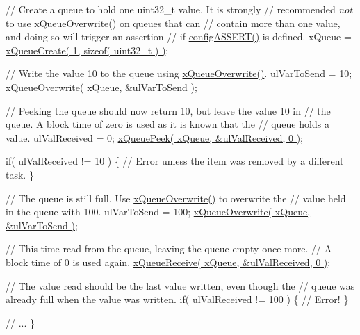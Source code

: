 \begin{DoxyPre}    // Create a queue to hold one uint32\_t value.  It is strongly
    // recommended {\itshape not} to use \hyperlink{queue_8h_a8e9ced123b5a0e37a36d3bbdb2e56b4e}{xQueueOverwrite()} on queues that can
    // contain more than one value, and doing so will trigger an assertion
    // if \hyperlink{_free_r_t_o_s_8h_a228c70cd48927d6ab730ed1a6dfbe35f}{configASSERT()} is defined.
    xQueue = \hyperlink{queue_8h_aeb858b824bd74a934ea7ebb81af2a6bb}{xQueueCreate( 1, sizeof( uint32\_t ) )};\end{DoxyPre}



\begin{DoxyPre}    // Write the value 10 to the queue using \hyperlink{queue_8h_a8e9ced123b5a0e37a36d3bbdb2e56b4e}{xQueueOverwrite()}.
    ulVarToSend = 10;
    \hyperlink{queue_8h_a8e9ced123b5a0e37a36d3bbdb2e56b4e}{xQueueOverwrite( xQueue, &ulVarToSend )};\end{DoxyPre}



\begin{DoxyPre}    // Peeking the queue should now return 10, but leave the value 10 in
    // the queue.  A block time of zero is used as it is known that the
    // queue holds a value.
    ulValReceived = 0;
    \hyperlink{queue_8h_a2df70733bb875477cd9614c5b3446257}{xQueuePeek( xQueue, &ulValReceived, 0 )};\end{DoxyPre}



\begin{DoxyPre}    if( ulValReceived != 10 )
    \{
        // Error unless the item was removed by a different task.
    \}\end{DoxyPre}



\begin{DoxyPre}    // The queue is still full.  Use \hyperlink{queue_8h_a8e9ced123b5a0e37a36d3bbdb2e56b4e}{xQueueOverwrite()} to overwrite the
    // value held in the queue with 100.
    ulVarToSend = 100;
    \hyperlink{queue_8h_a8e9ced123b5a0e37a36d3bbdb2e56b4e}{xQueueOverwrite( xQueue, &ulVarToSend )};\end{DoxyPre}



\begin{DoxyPre}    // This time read from the queue, leaving the queue empty once more.
    // A block time of 0 is used again.
    \hyperlink{queue_8h_af1549eac0e7f05694a59a0b967c80be3}{xQueueReceive( xQueue, &ulValReceived, 0 )};\end{DoxyPre}



\begin{DoxyPre}    // The value read should be the last value written, even though the
    // queue was already full when the value was written.
    if( ulValReceived != 100 )
    \{
        // Error!
    \}\end{DoxyPre}



\begin{DoxyPre}    // ...
\}
 \end{DoxyPre}
 